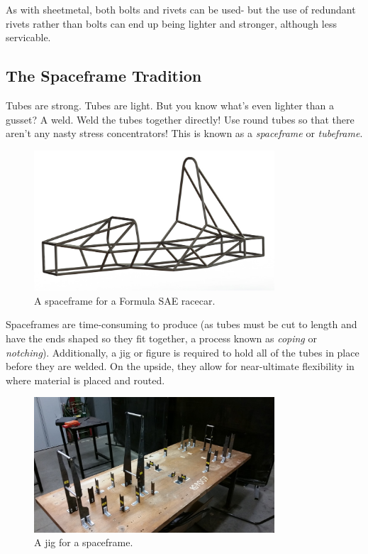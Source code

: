 \documentclass[10pt,letterpaper]{book}
\begin{document}
	As with sheetmetal, both bolts and rivets can be used- but the use of redundant rivets rather than bolts can end up being lighter and stronger, although less servicable.
	
	\subsection{The Spaceframe Tradition}
	Tubes are strong. Tubes are light. But you know what's even lighter than a gusset? A weld. Weld the tubes together directly! Use round tubes so that there aren't any nasty stress concentrators!  This is known as a \textit{spaceframe} or \textit{tubeframe}.
	
	
	\begin{figure}[H]
		\includegraphics[width=0.8\textwidth]{imgs/tradition_tubeframe.jpeg}
		\caption{A spaceframe for a Formula SAE racecar.}
	\end{figure}
	
	Spaceframes are time-consuming to produce (as tubes must be cut to length and have the ends shaped so they fit together, a process known as \textit{coping} or \textit{notching}). Additionally, a jig or figure is required to hold all of the tubes in place before they are welded. On the upside, they allow for near-ultimate flexibility in where material is placed and routed.
	
	\begin{figure}[H]
		\includegraphics[width=0.8\textwidth]{imgs/tradition_tubeframe_jigging.jpeg}
		\caption{A jig for a spaceframe.}
	\end{figure}
	
\end{document}
